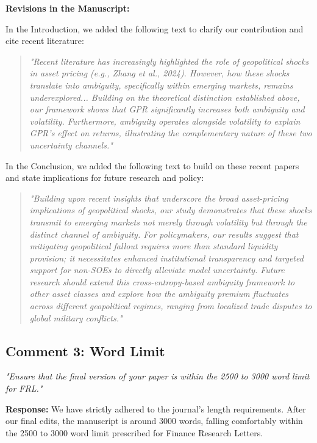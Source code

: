 \documentclass[12pt]{article}
\begin{document}
\begin{highlightbox}
\textbf{Revisions in the Manuscript:}

In the Introduction, we added the following text to clarify our contribution and cite recent literature:
\vspace{0.2cm}
\begin{quote}
\itshape "Recent literature has increasingly highlighted the role of geopolitical shocks in asset pricing (e.g., Zhang et al., 2024). However, how these shocks translate into ambiguity, specifically within emerging markets, remains underexplored... Building on the theoretical distinction established above, our framework shows that GPR significantly increases both ambiguity and volatility. Furthermore, ambiguity operates alongside volatility to explain GPR's effect on returns, illustrating the complementary nature of these two uncertainty channels."
\end{quote}

In the Conclusion, we added the following text to build on these recent papers and state implications for future research and policy:
\vspace{0.2cm}
\begin{quote}
\itshape "Building upon recent insights that underscore the broad asset-pricing implications of geopolitical shocks, our study demonstrates that these shocks transmit to emerging markets not merely through volatility but through the distinct channel of ambiguity. For policymakers, our results suggest that mitigating geopolitical fallout requires more than standard liquidity provision; it necessitates enhanced institutional transparency and targeted support for non-SOEs to directly alleviate model uncertainty. Future research should extend this cross-entropy-based ambiguity framework to other asset classes and explore how the ambiguity premium fluctuates across different geopolitical regimes, ranging from localized trade disputes to global military conflicts."
\end{quote}
\end{highlightbox}

\subsection*{Comment 3: Word Limit}
\textit{"Ensure that the final version of your paper is within the 2500 to 3000 word limit for FRL."}

\begin{highlightbox}
\textbf{Response:} We have strictly adhered to the journal's length requirements. After our final edits, the manuscript is around 3000 words, falling comfortably within the 2500 to 3000 word limit prescribed for Finance Research Letters.
\end{highlightbox}
\end{document}
